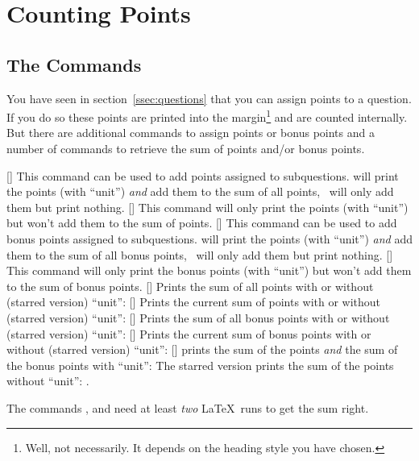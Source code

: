 \documentclass[load-preamble+,scrartcl={DIV10}]{cnltx-doc}
\begin{document}
\section{Counting Points}\label{sec:points}
\subsection{The Commands}
You have seen in section~\ref{ssec:questions} that you can assign points to a
question.  If you do so these points are printed into the
margin\footnote{Well, not necessarily.  It depends on the heading style you
  have chosen.} and are counted internally.  But there are additional commands
to assign points or bonus points and a number of commands to retrieve the sum
of points and/or bonus points.
\begin{commands}
  [\sarg{}]
    This command can be used to add points assigned to subquestions.
     will print the points (with ``unit'') \emph{and} add them
    to the sum of all points, \sarg\ will only add them but print
    nothing.
  [\sarg{}]
    This command will only print the points (with ``unit'') but won't add them
    to the sum of points.
  [\sarg{}]
    This command can be used to add bonus points assigned to subquestions.
     will print the points (with ``unit'') \emph{and} add them
    to the sum of all bonus points, \sarg\ will only add them but
    print nothing.
  [\sarg{}]
    This command will only print the bonus points (with ``unit'') but won't
    add them to the sum of bonus points.
  [\sarg]
    Prints the sum of all points with or without (starred version) ``unit'':
    \pointssum
  [\sarg]
    Prints the current sum of points with or without (starred version)
    ``unit'': \currentpointssum
  [\sarg]
    Prints the sum of all bonus points with or without (starred version)
    ``unit'': \bonussum
  [\sarg]
    Prints the current sum of bonus points with or without (starred version)
    ``unit'': \currentbonussum
  [\sarg]
    prints the sum of the points \emph{and} the sum of the bonus points with
    ``unit'': \totalpoints\space The starred version prints the sum of the
    points without ``unit'': \totalpoints*.
\end{commands}
The commands ,  and  need at
least \emph{two} \LaTeX\ runs to get the sum right.
\end{document}
